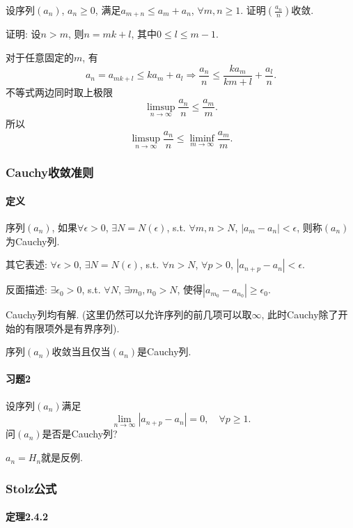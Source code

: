 设序列$\left(a_{n}\right)$, $a_{n}\ge0$, 满足$a_{m+n}\le a_{m}+a_{n}$,
$\forall m,n\ge1$. 证明$\left(\frac{a_{n}}{n}\right)$收敛.

证明: 设$n>m$, 则$n=mk+l$, 其中$0\le l\le m-1$. 

对于任意固定的$m$, 有
$$
a_{n}=a_{mk+l}\le ka_{m}+a_{l}\Longrightarrow\frac{a_{n}}{n}\le\frac{ka_{m}}{km+l}+\frac{a_{l}}{n}.
$$
不等式两边同时取上极限
$$
\limsup_{n\to\infty}\frac{a_{n}}{n}\le\frac{a_{m}}{m}.
$$
所以
$$
\limsup_{n\to\infty}\frac{a_{n}}{n}\le\liminf_{m\to\infty}\frac{a_{m}}{m}.
$$


\subsubsection{Cauchy收敛准则}

\paragraph{定义}

序列$\left(a_{n}\right)$, 如果$\forall\epsilon>0$, $\exists N=N(\epsilon)$,
s.t. $\forall m,n>N$, $\left|a_{m}-a_{n}\right|<\epsilon$, 则称$\left(a_{n}\right)$为Cauchy列.

其它表述: $\forall\epsilon>0$, $\exists N=N(\epsilon)$, s.t. $\forall n>N$,
$\forall p>0$, $\left|a_{n+p}-a_{n}\right|<\epsilon$.

反面描述: $\exists\epsilon_{0}>0$, s.t. $\forall N$, $\exists m_{0},n_{0}>N$,
使得$\left|a_{m_{0}}-a_{n_{0}}\right|\ge\epsilon_{0}$.

Cauchy列均有解. (这里仍然可以允许序列的前几项可以取$\infty$, 此时Cauchy除了开始的有限项外是有界序列).

序列$\left(a_{n}\right)$收敛当且仅当$\left(a_{n}\right)$是Cauchy列.

\paragraph{习题2}

设序列$\left(a_{n}\right)$满足
$$
\lim_{n\to\infty}\left|a_{n+p}-a_{n}\right|=0,\quad\forall p\ge1.
$$
问$\left(a_{n}\right)$是否是Cauchy列?

$a_{n}=H_{n}$就是反例.

\subsubsection{Stolz公式}

\paragraph{定理2.4.2}

